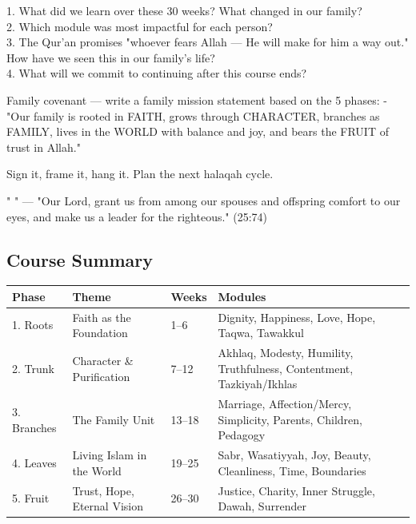 \documentclass[11pt,a4paper]{article}
\begin{document}
\begin{discussionbox} 1. What did we learn over these 30 weeks? What changed in our family? \\ 2. Which module was most impactful for each person? \\ 3. The Qur'an promises "whoever fears Allah --- He will make for him a way out." How have we seen this in our family's life? \\ 4. What will we commit to continuing after this course ends? \end{discussionbox}

\begin{activitybox} Family covenant --- write a family mission statement based on the 5 phases: - "Our family is rooted in FAITH, grows through CHARACTER, branches as FAMILY, lives in the WORLD with balance and joy, and bears the FRUIT of trust in Allah." \end{activitybox}

Sign it, frame it, hang it. Plan the next halaqah cycle.

\begin{duabox} "          " --- "Our Lord, grant us from among our spouses and offspring comfort to our eyes, and make us a leader for the righteous." (25:74) \end{duabox}

\vspace{6pt}\noindent{\color{border}\rule{\textwidth}{0.5pt}}\vspace{6pt}

\subsection*{Course Summary}

\begin{longtable}{|p{2.5cm}|p{3.5cm}|p{4.5cm}|p{5cm}|}
\hline
\textbf{\color{accent}Phase} & \textbf{\color{accent}Theme} & \textbf{\color{accent}Weeks} & \textbf{\color{accent}Modules} \\
\hline
1. Roots & Faith as the Foundation & 1–6 & Dignity, Happiness, Love, Hope, Taqwa, Tawakkul \\
\hline
2. Trunk & Character \& Purification & 7–12 & Akhlaq, Modesty, Humility, Truthfulness, Contentment, Tazkiyah/Ikhlas \\
\hline
3. Branches & The Family Unit & 13–18 & Marriage, Affection/Mercy, Simplicity, Parents, Children, Pedagogy \\
\hline
4. Leaves & Living Islam in the World & 19–25 & Sabr, Wasatiyyah, Joy, Beauty, Cleanliness, Time, Boundaries \\
\hline
5. Fruit & Trust, Hope, Eternal Vision & 26–30 & Justice, Charity, Inner Struggle, Dawah, Surrender \\
\hline
\end{longtable}
\end{document}
